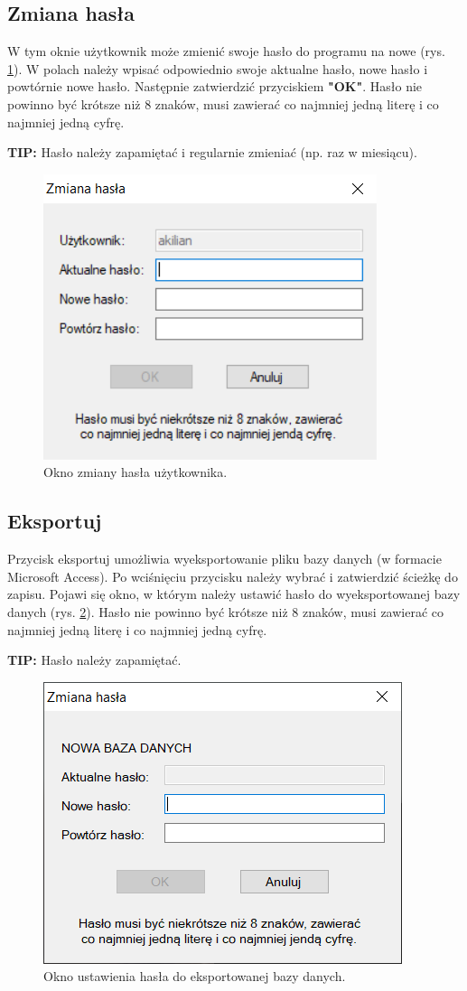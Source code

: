 \subsection{Zmiana hasła}
\label{zmiana_hasla}

W tym oknie użytkownik może zmienić swoje hasło do programu na nowe (rys. \ref{zmianaHasla}). W polach należy wpisać odpowiednio swoje aktualne hasło, nowe hasło i powtórnie nowe hasło. Następnie zatwierdzić przyciskiem \textbf{"OK"}. Hasło nie powinno być krótsze niż 8 znaków, musi zawierać co najmniej jedną literę i co najmniej jedną cyfrę.
	
\textbf{TIP:} Hasło należy zapamiętać i regularnie zmieniać (np. raz w miesiącu).

\begin{figure}[htb]
	\centering
	\includegraphics{obrazki/Ustawienia/zmiana_hasla.png}
	\caption{Okno zmiany hasła użytkownika.}
	\label{zmianaHasla}
\end{figure}

\subsection{Eksportuj}
\label{eksport}

Przycisk eksportuj umożliwia wyeksportowanie pliku bazy danych (w formacie Microsoft Access). Po wciśnięciu przycisku należy wybrać i zatwierdzić ścieżkę do zapisu. Pojawi się okno, w którym należy ustawić hasło do wyeksportowanej bazy danych (rys. \ref{zmianaHaslaBazyEksportowanej}).
Hasło nie powinno być krótsze niż 8 znaków, musi zawierać co najmniej jedną literę i co najmniej jedną cyfrę.

\textbf{TIP:} Hasło należy zapamiętać.

\begin{figure}[htb]
	\centering
	\includegraphics{obrazki/Ustawienia/zmiana_hasla_bazy.PNG}
	\caption{Okno ustawienia hasła do eksportowanej bazy danych.}
	\label{zmianaHaslaBazyEksportowanej}
\end{figure}
